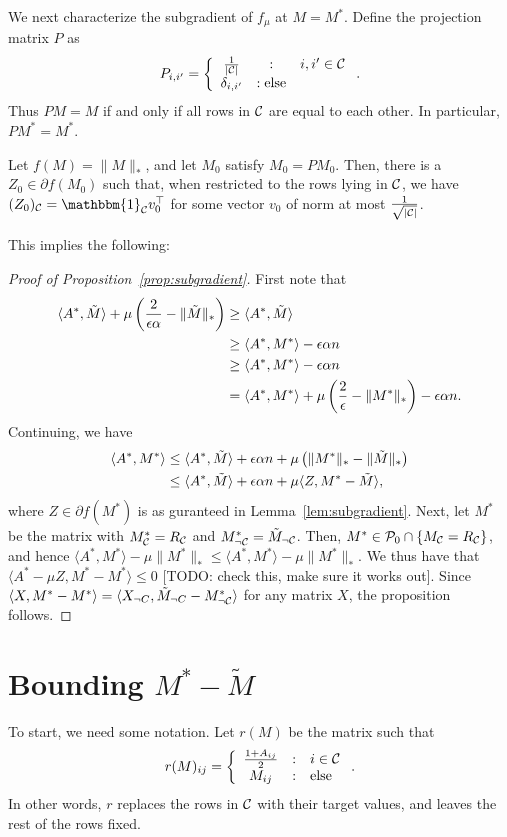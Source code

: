 \documentclass[11pt]{article}
\newcommand{\M}{\tilde{M}}
\newcommand{\Mm}{M^*}
\newcommand{\Aa}{A^*}
\newcommand{\bi}{\mathbbm{1}}
\newcommand{\todo}[1]{{\color{red} [TODO: {#1}]}}
\begin{document}
We next characterize the subgradient of $f_{\mu}$ at $M = \Mm$.
Define the projection matrix $P$ as
\[ P_{i,i'} = \left\{ \begin{array}{ccl} \frac{1}{|\mathcal{C}|} & : & i, i' \in \mathcal{C} \\ \delta_{i,i'} & : \text{else} \end{array} \right.. \]
Thus $PM = M$ if and only if all rows in $\mathcal{C}$ are equal to each other.
In particular, $P\Mm = \Mm$.
\begin{lemma}
\label{lem:subgradient}
Let $f(M) = \|M\|_*$, and let 
$M_0$ satisfy $M_0 = PM_0$. Then,
there is a $Z_0 \in \partial f(M_0)$ such that, when restricted 
to the rows lying in $\mathcal{C}$, we have $(Z_0)_{\sC} = \bi_{\sC} v_0^{\top}$
for some vector $v_0$ of norm at most $\frac{1}{\sqrt{|\mathcal{C}|}}$.
\end{lemma}
This implies the following:

\begin{proof}[Proof of Proposition~\ref{prop:subgradient}]
First note that
\begin{align}
\langle \Aa, \M \rangle + \mu \p{\frac{2}{\epsilon\alpha} - \|\M\|_*} 
 &\geq \langle \Aa, \M \rangle \\
 &\geq \langle \Aa, M^* \rangle - \epsilon\alpha n \\
 &\geq \langle \Aa, \Mm \rangle - \epsilon\alpha n \\
 &= \langle \Aa, \Mm \rangle + \mu\p{\frac{2}{\epsilon} - \|\Mm\|_*} - \epsilon\alpha n.
\end{align}
Continuing, we have
\begin{align}
\langle \Aa, \Mm \rangle &\leq \langle \Aa, \M \rangle + \epsilon\alpha n + \mu\p{\|\Mm\|_* - \|\M\|_*} \\
 &\leq \langle A^*, \M \rangle + \epsilon \alpha n + \mu \langle Z, \Mm - \M \rangle,
\end{align}
where $Z \in \partial f(\Mm)$ is as guranteed in Lemma~\ref{lem:subgradient}. Next, let 
$\Mm$ be the matrix with $\Mm_{\sC} = R_{\sC}$ and $\Mm_{\neg \sC} = \M_{\neg \sC}$. Then, 
$\Mm \in \sP_0 \cap \{M_{\sC} = R_{\sC}\}$, and hence 
$\langle \Aa, \Mm \rangle - \mu \|\Mm\|_* \leq \langle \Aa, \Mm \rangle - \mu \|\Mm\|_*$. 
We thus have that $\langle \Aa - \mu Z, \Mm - \Mm \rangle \leq 0$ \todo{check this, make sure it works out}. Since 
$\langle X, \Mm - \Mm \rangle = \langle X_{\neg C}, \M_{\neg C} - \Mm_{\neg \sC} \rangle$ for 
any matrix $X$, the proposition follows.
\end{proof}
\section{Bounding $M^* - \M$}
To start, we need some notation. Let $r(M)$ be the matrix such that
\[ r(M)_{ij} = \left\{ \begin{array}{ccl} \frac{1+A_{ij}}{2} & : & i \in \mathcal{C} \\ M_{ij} & : & \text{else} \end{array} \right.. \]
In other words, $r$ replaces the rows in $\mathcal{C}$ with their target values, and 
leaves the rest of the rows fixed.
\end{document}
